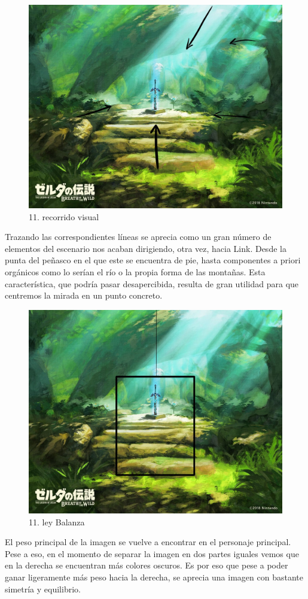 \documentclass[12pt]{article}
\begin{document}
    \begin{figure}[H]
      \centering
      \includegraphics[scale=0.35]{images/Carlos/12/Flechas.jpg}
      \caption{\small 11. recorrido visual}
    \end{figure}
    Trazando las correspondientes líneas se aprecia como un gran número de elementos del escenario nos acaban dirigiendo, otra vez, hacia Link. Desde la punta del peñasco en el que este se encuentra de pie, hasta componentes a priori orgánicos como lo serían el río o la propia forma de las montañas. Esta característica, que podría pasar desapercibida, resulta de gran utilidad para que centremos la mirada en un punto concreto.

    \begin{figure}[H]
      \centering
      \includegraphics[scale=0.35]{images/Carlos/12/Balanza.jpg}
      \caption{\small 11. ley Balanza}
    \end{figure}
    El peso principal de la imagen se vuelve a encontrar en el personaje principal. Pese a eso, en el momento de separar la imagen en dos partes iguales vemos que en la derecha se encuentran más colores oscuros. Es por eso que pese a poder ganar ligeramente más peso hacia la derecha, se aprecia una imagen con bastante simetría y equilibrio.
\end{document}
